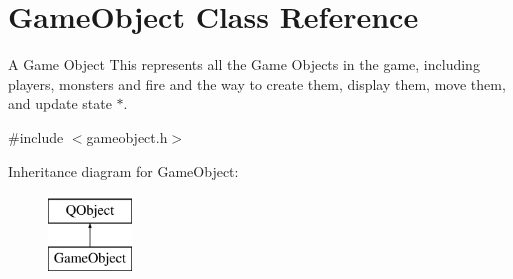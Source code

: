 \hypertarget{classGameObject}{\section{Game\-Object Class Reference}
\label{classGameObject}
}


A Game Object This represents all the Game Objects in the game, including players, monsters and fire and the way to create them, display them, move them, and update state $\ast$.  




{\ttfamily \#include $<$gameobject.\-h$>$}

Inheritance diagram for Game\-Object\-:\begin{figure}[H]
\begin{center}
\leavevmode
\includegraphics[height=2.000000cm]{classGameObject}
\end{center}
\end{figure}
